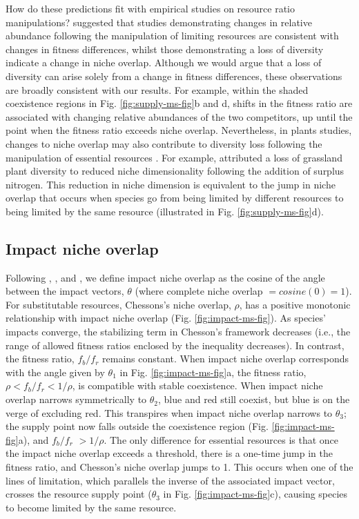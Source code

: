 How do these predictions fit with empirical studies on resource ratio manipulations? \citet{Hillerislambers2012} suggested that studies demonstrating changes in relative abundance following the manipulation of limiting resources are consistent with changes in fitness differences, whilst those demonstrating a loss of diversity indicate a change in niche overlap. Although we would argue that a loss of diversity can arise solely from a change in fitness differences, these observations are broadly consistent with our results. For example, within the shaded coexistence regions in Fig. \ref{fig:supply-ms-fig}b and d, shifts in the fitness ratio are associated with changing relative abundances of the two competitors, up until the point when the fitness ratio exceeds niche overlap. Nevertheless, in plants studies, changes to niche overlap may also contribute to diversity loss following the manipulation of essential resources \citep{Harpole2007, Clark2007, Hautier2009}. For example, \citet{Harpole2007} attributed a loss of grassland plant diversity to reduced niche dimensionality following the addition of surplus nitrogen. This reduction in niche dimension is equivalent to the jump in niche overlap that occurs when species go from being limited by different resources to being limited by the same resource (illustrated in Fig. \ref{fig:supply-ms-fig}d).   
\par



\subsection{Impact niche overlap}
Following \cite{Pianka1973}, \cite{Petraitis1989}, and \cite{Chase2003}, we define impact niche overlap as the cosine of the angle between the impact vectors, $\theta$ (where complete niche overlap $= cosine(0) = 1$). For substitutable resources, Chessons's niche overlap, $\rho$, has a positive monotonic relationship with impact niche overlap (Fig. \ref{fig:impact-ms-fig}). As species' impacts converge, the stabilizing term in Chesson's framework decreases (i.e., the range of allowed fitness ratios enclosed by the inequality decreases). In contrast, the fitness ratio, $f_{b}/f_{r}$ remains constant. When impact niche overlap corresponds with the angle given by $\theta_{1}$ in Fig. \ref{fig:impact-ms-fig}a, the fitness ratio, $\rho < f_{b}/f_{r} <1/\rho$, is compatible with stable coexistence. When impact niche overlap narrows symmetrically to $\theta_{2}$, blue and red still coexist, but blue is on the verge of excluding red. This transpires when impact niche overlap narrows to $\theta_{3}$; the supply point now falls outside the coexistence region (Fig. \ref{fig:impact-ms-fig}a), and $f_{b}/f_{r}$ $>1/\rho$. The only difference for essential resources is that once the  impact niche overlap exceeds a threshold, there is a one-time jump in the fitness ratio, and Chesson's niche overlap jumps to 1. This occurs when one of the lines of limitation, which parallels the inverse of the associated impact vector, crosses the resource supply point ($\theta_{3}$ in Fig. \ref{fig:impact-ms-fig}c), causing species to become limited by the same resource.
\par


